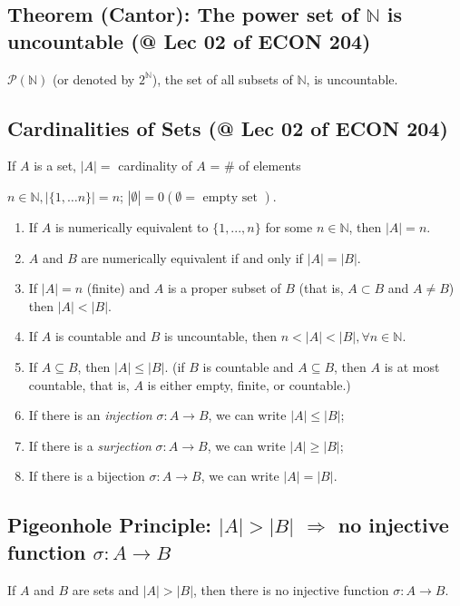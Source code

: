 \documentclass[11pt]{elegantbook}
\begin{document}
\subsection{Theorem (Cantor): The power set of $\mathbb{N}$ is uncountable \small{(@ Lec 02 of ECON 204)}}
\begin{theorem}[Cantor]
    $\mathcal{P}(\mathbb{N})$ (or denoted by $2^\mathbb{N}$), the set of all subsets of $\mathbb{N}$, is uncountable.
\end{theorem}

\subsection{Cardinalities of Sets \small{(@ Lec 02 of ECON 204)}}
\begin{definition}[Cardinality]
    If $A$ is a set, $|A|=$ cardinality of $A$ = $\#$ of elements
\end{definition}
$n \in \mathbb{N},|\{1, \ldots n\}|=n$; $|\emptyset|=0(\emptyset=\text { empty set })$.

\begin{proposition}
    \begin{enumerate}
        \item If $A$ is numerically equivalent to $\{1,...,n\}$ for some $n\in \mathbb{N}$, then $|A|=n$.
        \item $A$ and $B$ are numerically equivalent if and only if $|A|=|B|$.
        \item If $|A| = n$ (finite) and $A$ is a proper subset of $B$ (that is, $A\subset B$ and $A \neq B$) then $|A|<|B|$.
        \item If $A$ is countable and $B$ is uncountable, then $n<|A|<|B|, \forall n\in\mathbb{N}$.
        \item If $A\subseteq B$, then $|A|\leq|B|$. (if $B$ is countable and $A\subseteq B$, then $A$ is at most countable, that is, $A$ is either empty, finite, or countable.)
        \item If there is an \textit{injection} $\sigma:A \rightarrow B$, we can write $|A|\leq|B|$;
        \item If there is a \textit{surjection} $\sigma:A \rightarrow B$, we can write $|A|\geq|B|$;
        \item If there is a bijection $\sigma:A \rightarrow B$, we can write $|A|=|B|$.
    \end{enumerate}
\end{proposition}

\subsection{Pigeonhole Principle: $|A|>|B|$ $\Rightarrow$ no injective function $\sigma:A \rightarrow B$}
\begin{theorem}
    If $A$ and $B$ are sets and $|A|>|B|$, then there is no injective function $\sigma:A \rightarrow B$.
\end{theorem}
\end{document}

